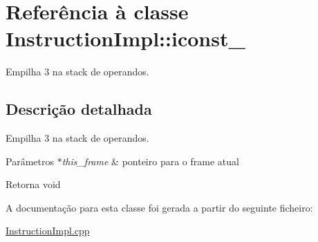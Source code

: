 \hypertarget{class_instruction_impl_1_1iconst__3}{}\section{Referência à classe Instruction\+Impl\+:\+:iconst\+\_}
\label{class_instruction_impl_1_1iconst__3}


Empilha 3 na stack de operandos.  




\subsection{Descrição detalhada}
Empilha 3 na stack de operandos. 


\begin{DoxyParams}{Parâmetros}
{\em $\ast$this\+\_\+frame} & ponteiro para o frame atual \\
\hline
\end{DoxyParams}
\begin{DoxyReturn}{Retorna}
void 
\end{DoxyReturn}


A documentação para esta classe foi gerada a partir do seguinte ficheiro\+:\begin{DoxyCompactItemize}
\item 
\hyperlink{_instruction_impl_8cpp}{Instruction\+Impl.\+cpp}\end{DoxyCompactItemize}
